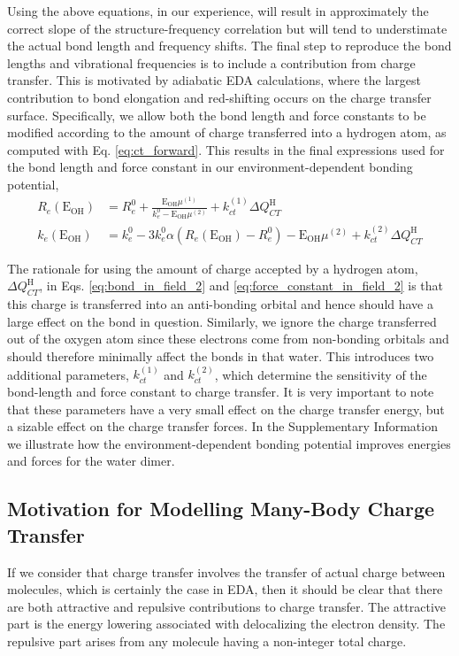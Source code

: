 \documentclass[journal=jctcce,manuscript=article]{achemso}
\begin{document}
Using the above equations, in our experience, will result in approximately the correct slope of the structure-frequency correlation but will tend to understimate the actual bond length and frequency shifts. The final step to reproduce the bond lengths and vibrational frequencies is to include a contribution from charge transfer. This is motivated by adiabatic EDA calculations, where the largest contribution to bond elongation and red-shifting occurs on the charge transfer surface.\cite{mao2017energy} Specifically, we allow both the bond length and force constants to be modified according to the amount of charge transferred into a hydrogen atom, as computed with Eq. \ref{eq:ct_forward}. This results in the final expressions used for the bond length and force constant in our environment-dependent bonding potential,
\begin{align}
  \label{eq:bond_in_field_2}
  R_e(\mathrm{E_{OH}})&=R_e^0+ \frac{\mathrm{E_{OH}}\mu^{(1)}}{k_e^0-\mathrm{E_{OH}}\mu^{(2)}} + k_{ct}^{(1)}\Delta Q_{CT}^{\mathrm{H}} \\
  \label{eq:force_constant_in_field_2}
  k_e(\mathrm{E_{OH}})&=k_e^0-3k_e^0\alpha\left(R_e(\mathrm{E_{OH}})-R_e^0\right)-\mathrm{E_{OH}}\mu^{(2)}+k_{ct}^{(2)}\Delta Q_{CT}^{\mathrm{H}}
\end{align}

The rationale for using the amount of charge accepted by a hydrogen atom, $\Delta Q_{CT}^{\mathrm{H}}$, in Eqs. \ref{eq:bond_in_field_2} and \ref{eq:force_constant_in_field_2} is that this charge is transferred into an anti-bonding orbital and hence should have a large effect on the  bond in question. Similarly, we ignore the charge transferred out of the oxygen atom since these electrons come from non-bonding orbitals and should therefore minimally affect the  bonds in that water. This introduces two additional parameters, $k_{ct}^{(1)}$ and $k_{ct}^{(2)}$, which determine the sensitivity of the bond-length and force constant to charge transfer. It is very important to note that these parameters have a very small effect on the charge transfer energy, but a sizable effect on the charge transfer forces. In the Supplementary Information we illustrate how the environment-dependent bonding potential improves energies and forces for the water dimer. 


\subsection*{Motivation for Modelling Many-Body Charge Transfer}
If we consider that charge transfer involves the transfer of actual charge between
molecules, which is certainly the case in EDA\cite{thirman2018characterizing},
then it should be clear that there are both attractive and repulsive contributions
to charge transfer. The attractive part is the energy lowering associated with delocalizing
the electron density. The repulsive part arises from any molecule having a non-integer
total charge.
\end{document}
